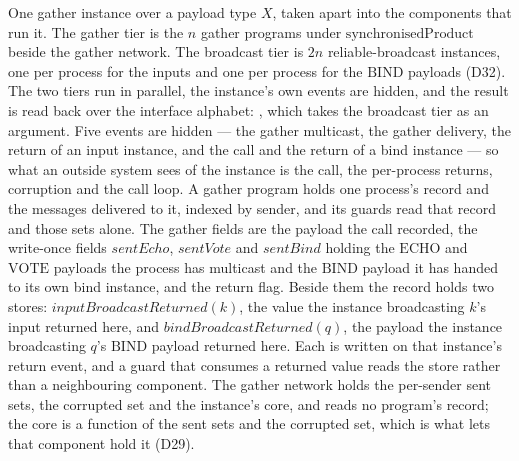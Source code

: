 \begin{definition}
  \label{def:aba-gather-sub}
  \leanok
  One gather instance over a payload type $X$, taken apart into the components that run it.
  The gather tier is the $n$ gather programs under $\mathrm{synchronisedProduct}$ beside the gather network.
  The broadcast tier is $2n$ reliable-broadcast instances, one per process for the inputs and one per process for the $\mathrm{BIND}$ payloads (D32).
  The two tiers run in parallel, the instance's own events are hidden, and the result is read back over the interface alphabet: , which takes the broadcast tier as an argument.
  Five events are hidden --- the gather multicast, the gather delivery, the return of an input instance, and the call and the return of a bind instance --- so what an outside system sees of the instance is the call, the per-process returns, corruption and the call loop.
  A gather program holds one process's record and the messages delivered to it, indexed by sender, and its guards read that record and those sets alone.
  The gather fields are the payload the call recorded, the write-once fields $\mathit{sentEcho}$, $\mathit{sentVote}$ and $\mathit{sentBind}$ holding the $\mathrm{ECHO}$ and $\mathrm{VOTE}$ payloads the process has multicast and the $\mathrm{BIND}$ payload it has handed to its own bind instance, and the return flag.
  Beside them the record holds two stores: $\mathit{inputBroadcastReturned}(k)$, the value the instance broadcasting $k$'s input returned here, and $\mathit{bindBroadcastReturned}(q)$, the payload the instance broadcasting $q$'s $\mathrm{BIND}$ payload returned here.
  Each is written on that instance's return event, and a guard that consumes a returned value reads the store rather than a neighbouring component.
  The gather network holds the per-sender sent sets, the corrupted set and the instance's core, and reads no program's record; the core is a function of the sent sets and the corrupted set, which is what lets that component hold it (D29).

\end{definition}
